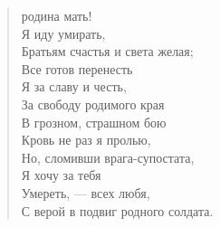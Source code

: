 \newpage
\vspace*{0cm}


\begin{verse}
\begin{patverse*}
 родина мать!\\
    Я иду умирать,\\
Братьям счастья и света желая;\\
    Все готов перенесть\\
    Я за славу и честь,\\
За свободу родимого края\ldotst\\
    В грозном, страшном бою\\
    Кровь не раз я пролью,\\
Но, сломивши врага-супостата,\\
    Я хочу за тебя\\
    Умереть, --- всех любя,\\
С верой в подвиг родного солдата.
\end{patverse*}
\end{verse}

\newpage
\vspace*{0cm}



